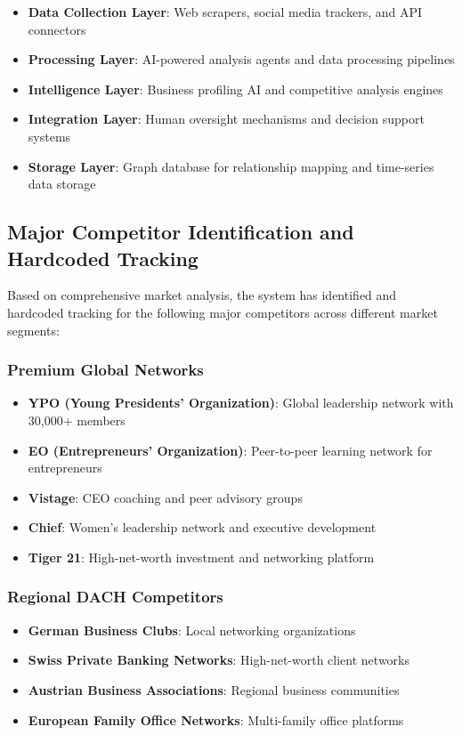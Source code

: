 \begin{itemize}
    \item \textbf{Data Collection Layer}: Web scrapers, social media trackers, and API connectors
    \item \textbf{Processing Layer}: AI-powered analysis agents and data processing pipelines
    \item \textbf{Intelligence Layer}: Business profiling AI and competitive analysis engines
    \item \textbf{Integration Layer}: Human oversight mechanisms and decision support systems
    \item \textbf{Storage Layer}: Graph database for relationship mapping and time-series data storage
\end{itemize}

\subsection{Major Competitor Identification and Hardcoded Tracking}

Based on comprehensive market analysis, the system has identified and hardcoded tracking for the following major competitors across different market segments:

\subsubsection{Premium Global Networks}
\begin{itemize}
    \item \textbf{YPO (Young Presidents' Organization)}: Global leadership network with 30,000+ members
    \item \textbf{EO (Entrepreneurs' Organization)}: Peer-to-peer learning network for entrepreneurs
    \item \textbf{Vistage}: CEO coaching and peer advisory groups
    \item \textbf{Chief}: Women's leadership network and executive development
    \item \textbf{Tiger 21}: High-net-worth investment and networking platform
\end{itemize}

\subsubsection{Regional DACH Competitors}
\begin{itemize}
    \item \textbf{German Business Clubs}: Local networking organizations
    \item \textbf{Swiss Private Banking Networks}: High-net-worth client networks
    \item \textbf{Austrian Business Associations}: Regional business communities
    \item \textbf{European Family Office Networks}: Multi-family office platforms
\end{itemize}

